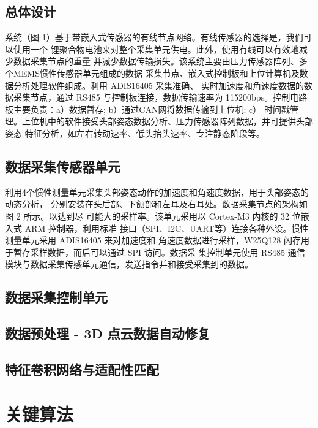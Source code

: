 \documentclass[a4paper,12pt]{ctexbook}	%
\begin{document}
\subsection{总体设计}

{\songti 
系统（图 1）基于带嵌入式传感器的有线节点网络。有线传感器的选择是，我们可以使用一个
锂聚合物电池来对整个采集单元供电。此外，使用有线可以有效地减少数据采集节点的重量
并减少数据传输损失。该系统主要由压力传感器阵列、多个MEMS惯性传感器单元组成的数据
采集节点、嵌入式控制板和上位计算机及数据分析处理软件组成。利用 ADIS16405 采集准确、
实时加速度和角速度数据的数据采集节点，通过 RS485 与控制板连接，数据传输速率为
115200bps。控制电路板主要负责：a）数据暂存; b）通过CAN网将数据传输到上位机; c）
时间戳管理。上位机中的软件接受头部姿态数据分析、压力传感器阵列数据，并可提供头部姿态
特征分析，如左右转动速率、低头抬头速率、专注静态阶段等。
}

\subsection{数据采集传感器单元}

{\songti 
利用4个惯性测量单元采集头部姿态动作的加速度和角速度数据，用于头部姿态的动态分析，
分别安装在头后部、下颌部和左耳及右耳处。数据采集节点的架构如图 2 所示。以达到尽
可能大的采样率。该单元采用以 Cortex-M3 内核的 32 位嵌入式 ARM 控制器，利用标准
接口（SPI、I2C、UART等）连接各种外设。惯性测量单元采用 ADIS16405 来对加速度和
角速度数据进行采样，W25Q128 闪存用于暂存采样数据，而后可以通过 SPI 访问。数据采
集控制单元使用 RS485 通信模块与数据采集传感单元通信，发送指令并和接受采集到的数据。
}

\subsection{数据采集控制单元}

{\songti 
}

\subsection{数据预处理 - 3D 点云数据自动修复}

\subsection{特征卷积网络与适配性匹配}

\section{关键算法}
\end{document}
